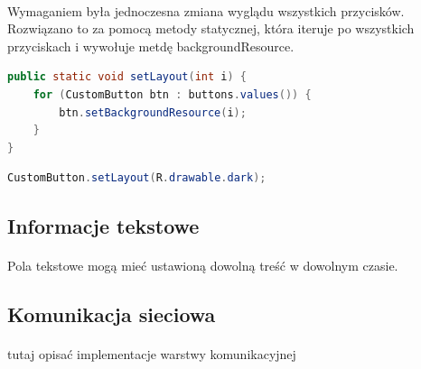 \paragraph{}
Wymaganiem była jednoczesna zmiana wyglądu wszystkich przycisków. Rozwiązano to za pomocą metody statycznej, która iteruje po wszystkich przyciskach i wywołuje metdę backgroundResource.


\begin{lstlisting}[language=Java]
 public static void setLayout(int i) {
    for (CustomButton btn : buttons.values()) {
        btn.setBackgroundResource(i);
    }
}
\end{lstlisting}


\begin{lstlisting}[language=Java]
CustomButton.setLayout(R.drawable.dark);
\end{lstlisting}



\subsection{Informacje tekstowe}
\paragraph{}
Pola tekstowe mogą mieć ustawioną dowolną treść w dowolnym czasie.

\subsection{Komunikacja sieciowa}
\paragraph{}
{\color{red}tutaj opisać implementacje warstwy komunikacyjnej}
